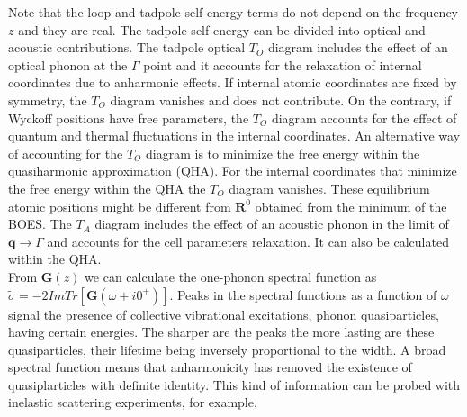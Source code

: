 Note that the loop and tadpole self-energy terms do not depend on the frequency $z$ and they are real. The tadpole self-energy can be divided into optical and acoustic contributions. The tadpole optical $T_{O}$ diagram includes 
the effect of an optical phonon at the $\Gamma$ point and it accounts for the relaxation of internal coordinates due to anharmonic effects. If internal atomic coordinates are fixed by symmetry, the $T_{O}$ diagram vanishes and 
does not contribute\cite{calandra2007anharmonic}. On the contrary, if Wyckoff positions have free parameters\cite{aroyo2011crystallography}, the $T_{O}$ diagram accounts for the effect of quantum and thermal fluctuations in the 
internal coordinates. An alternative way of accounting for the $T_{O}$ diagram is to minimize the free energy within the quasiharmonic approximation (QHA)\cite{bonini2007phonon}. For the internal coordinates that minimize the 
free energy within the QHA the $T_{O}$ diagram vanishes. These equilibrium atomic positions might be different from $\mathbf{R}^{0}$ obtained from the minimum of the BOES. The $T_{A}$ diagram includes the effect of an acoustic 
phonon in the limit of $\mathbf{q}\rightarrow\Gamma$ and accounts for the cell parameters relaxation. It can also be calculated within the QHA\cite{bonini2007phonon}.  
\\

From $\boldsymbol{G}(z)$ we can calculate the one-phonon spectral function as $\tilde{\sigma}=-2ImTr[\boldsymbol{G}(\omega+i0^{+})]$. Peaks in the spectral functions as a function of $\omega$ signal the presence of 
collective vibrational excitations, phonon quasiparticles, having certain energies. The sharper are the peaks the more lasting are these quasiparticles, their lifetime being inversely proportional to the width. A broad 
spectral function means that anharmonicity has removed the existence of quasiplarticles with definite identity. This kind of information can be probed with inelastic scattering experiments, for example.  \\ 

